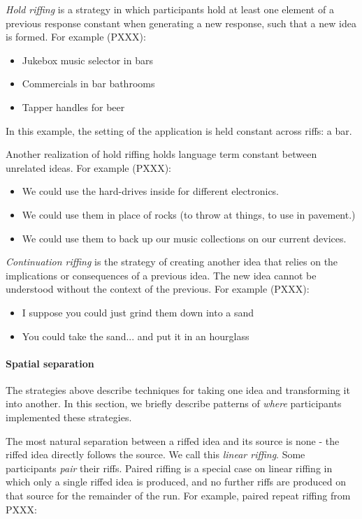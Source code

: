 \emph{Hold riffing} is a strategy in which participants hold at least one element of a previous response constant when generating a new response, such that a new idea is formed. For example (PXXX):

\begin{itemize}
    \item Jukebox music selector in bars
    \item Commercials in bar bathrooms 
    \item Tapper handles for beer 
\end{itemize}

In this example, the setting of the application is held constant across riffs: a bar.

Another realization of hold riffing holds language term constant between unrelated ideas. For example (PXXX):

\begin{itemize}
    \item We could use the hard-drives inside for different electronics.
    \item We could use them in place of rocks (to throw at things, to use in pavement.)
    \item We could use them to back up our music collections on our current devices.
\end{itemize}

\emph{Continuation riffing} is the strategy of creating another idea that relies on the implications or consequences of a previous idea. The new idea cannot be understood without the context of the previous. For example (PXXX):

\begin{itemize}
    \item I suppose you could just grind them down into a sand
    \item You could take the sand... and put it in an hourglass
\end{itemize}

\paragraph{Spatial separation}

The strategies above describe techniques for taking one idea and transforming it into another. In this section, we briefly describe patterns of \emph{where} participants implemented these strategies.

The most natural separation between a riffed idea and its source is none - the riffed idea directly follows the source. We call this \emph{linear riffing}. Some participants \emph{pair} their riffs. Paired riffing is a special case on linear riffing in which only a single riffed idea is produced, and no further riffs are produced on that source for the remainder of the run. For example, paired repeat riffing from PXXX:

